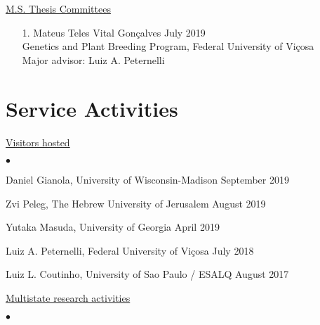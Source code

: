 \documentclass[margin,line,10pt]{res}
\newenvironment{list2}{
  \begin{list}{$\bullet$}{%
      \setlength{\itemsep}{0in}
      \setlength{\parsep}{0in} \setlength{\parskip}{0in}
      \setlength{\topsep}{0in} \setlength{\partopsep}{0in} 
      \setlength{\leftmargin}{0.2in}}}{\end{list}}
\begin{document}
\begin{resume}
\begin{flushleft}
\hspace{0.2cm} \underline{M.S. Thesis Committees}
\end{flushleft}
\begin{enumerate}
\item [1.] Mateus Teles Vital Gon\c calves  \hfill July 2019 \\
  Genetics and Plant Breeding Program, Federal University of  Vi\c cosa\\
  Major advisor: Luiz A. Peternelli
\end{enumerate}




\vspace{0.5cm}
\section{\sc Service Activities}

\begin{flushleft}
\hspace{0.2cm} \underline{Visitors hosted}
\end{flushleft}
\begin{list2}
\item Daniel Gianola, University of Wisconsin-Madison  \hfill September 2019\\

\item Zvi Peleg, The Hebrew University of Jerusalem   \hfill August 2019\\

\item Yutaka Masuda, University of Georgia \hfill April 2019\\


\item Luiz A. Peternelli, Federal University of Vi\c cosa  \hfill July 2018\\

    
\item Luiz L. Coutinho, University of Sao Paulo / ESALQ  \hfill August 2017\\


\end{list2}


\begin{flushleft}
\hspace{0.3cm} \underline{Multistate research activities}
\end{flushleft}
\begin{list2}


\end{list2}
\end{resume}
\end{document}
